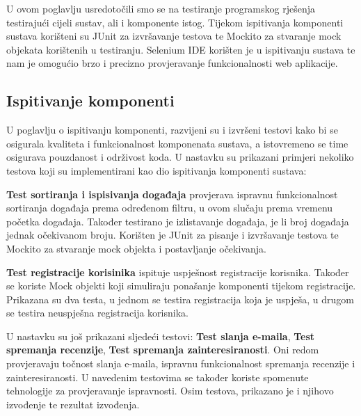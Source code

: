			U ovom poglavlju usredotočili smo se na testiranje programskog rješenja testirajući cijeli sustav, ali i komponente istog. Tijekom ispitivanja komponenti sustava korišteni su JUnit za izvršavanje testova te Mockito za stvaranje mock objekata korištenih u testiranju. Selenium IDE korišten je u ispitivanju sustava te nam je omogućio brzo i precizno provjeravanje funkcionalnosti web aplikacije.
			
			\subsection{Ispitivanje komponenti}
			
			U poglavlju o ispitivanju komponenti, razvijeni su i izvršeni testovi kako bi se osigurala kvaliteta i funkcionalnost komponenata sustava, a istovremeno se time osigurava pouzdanost i održivost koda. U nastavku su prikazani primjeri nekoliko testova koji su implementirani kao dio ispitivanja komponenti sustava:

			\textbf{Test sortiranja i ispisivanja događaja} provjerava ispravnu funkcionalnost sortiranja događaja prema određenom filtru, u ovom slučaju prema vremenu početka događaja. Također testirano je izlistavanje događaja, je li broj događaja jednak očekivanom broju. Korišten je JUnit za pisanje i izvršavanje testova te Mockito za stvaranje mock objekta i postavljanje očekivanja.


			\textbf{Test registracije korisinika} ispituje uspješnost registracije korisnika. Također se koriste Mock objekti koji simuliraju ponašanje komponenti tijekom registracije. Prikazana su dva testa, u jednom se testira registracija koja je uspješa, u drugom se testira neuspješna registracija korisnika.

			U nastavku su još prikazani sljedeći testovi: \textbf{Test slanja e-maila}, \textbf{Test spremanja recenzije}, \textbf{Test spremanja zainteresiranosti}. Oni redom provjeravaju točnost slanja e-maila, ispravnu funkcionalnost spremanja recenzije i zainteresiranosti. U navedenim testovima se također koriste spomenute tehnologije za provjeravanje ispravnosti. Osim testova, prikazano je i njihovo izvođenje te rezultat izvođenja.
			

